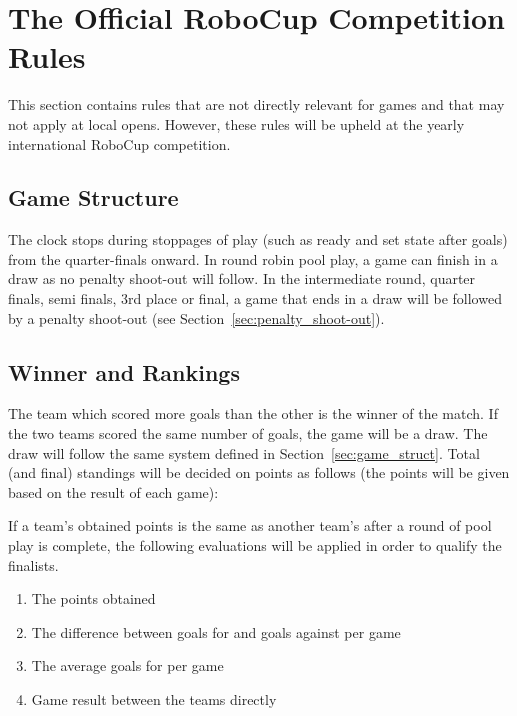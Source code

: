\documentclass[12pt]{article}
\begin{document}
\newpage


\appendix
\section{The Official RoboCup Competition Rules}
\label{sec:comRules}
This section contains rules that are not directly relevant for games and that may not apply at local opens.  However, these rules will be upheld at the yearly international RoboCup competition.

\subsection{Game Structure}

The clock stops during stoppages of play (such as ready and set state after goals) from the quarter-finals onward.  In round robin pool play, a game can finish in a draw as no penalty shoot-out will follow. In the intermediate round, quarter finals, semi finals, 3rd place or final, a game that ends in a draw will be followed by a penalty shoot-out (see Section~\ref{sec:penalty_shoot-out}).

\subsection{Winner and Rankings}
\label{sec:rankings}

The team which scored more goals than the other is the winner of the match. If the two teams scored the same number of goals, the game will be a draw. The draw will follow the same system defined in Section~\ref{sec:game_struct}. Total (and final) standings will be decided on points as follows (the points will be given based on the result of each game):


If a team's obtained points is the same as another team's after a round of pool play is complete, the following evaluations will be applied in order to qualify the finalists.

\begin{enumerate}

\item The points obtained

\item The difference between goals for and goals against per game

\item The average goals for per game

\item Game result between the teams directly

\end{enumerate}
\end{document}
